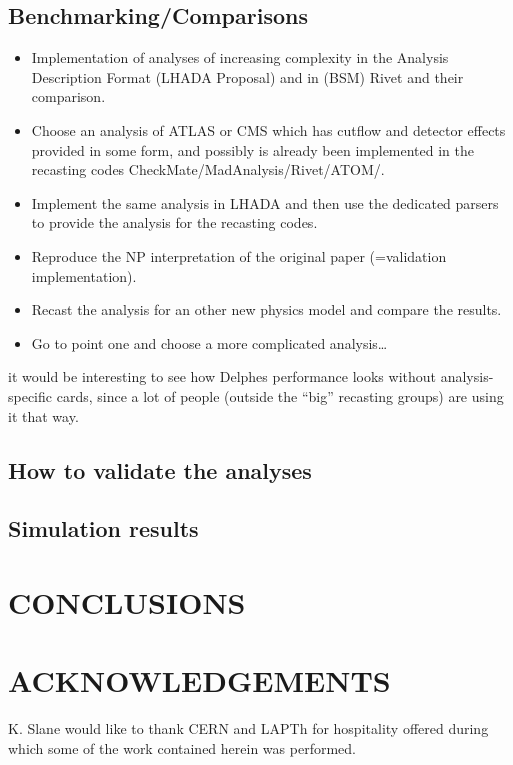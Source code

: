 \documentclass[11pt]{cernrep}
\begin{document}
\subsection{Benchmarking/Comparisons}

\begin{itemize}
\item Implementation of analyses of increasing complexity in the Analysis Description Format (LHADA Proposal) and in (BSM) Rivet and their comparison.
\item Choose an analysis of ATLAS or CMS which has cutflow and detector effects provided in some form, and possibly is already been implemented in the recasting codes CheckMate/MadAnalysis/Rivet/ATOM/.
\item Implement the same analysis in LHADA and then use the dedicated parsers to provide the analysis for the recasting codes.
\item Reproduce the NP interpretation of the original paper (=validation implementation).
\item Recast the analysis for an other new physics model and compare the results.
\item Go to point one and choose a more complicated analysis…
\end{itemize}
it would be interesting to see how Delphes performance looks without analysis-specific cards, since a lot of people (outside the “big” recasting groups) are using it that way.

\subsection{How to validate the analyses}

\subsection{Simulation results}

\section*{CONCLUSIONS}


\section*{ACKNOWLEDGEMENTS}
K. Slane would like to thank CERN and LAPTh for hospitality offered
during which some of the work contained herein was performed.


\end{document}

